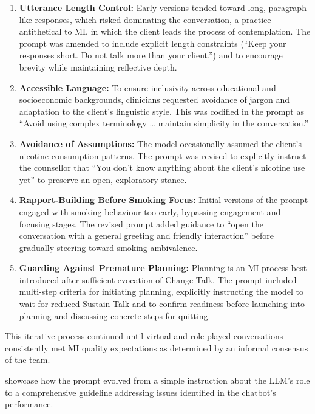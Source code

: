 \begin{enumerate}
	\item \textbf{Utterance Length Control:} Early versions tended toward long, paragraph-like responses, which risked dominating the conversation, a practice antithetical to MI, in which the client leads the process of contemplation. The prompt was amended to include explicit length constraints (``Keep your responses short. Do not talk more than your client.'') and to encourage brevity while maintaining reflective depth.

	\item \textbf{Accessible Language:} To ensure inclusivity across educational and socioeconomic backgrounds, clinicians requested avoidance of jargon and adaptation to the client's linguistic style. This was codified in the prompt as ``Avoid using complex terminology … maintain simplicity in the conversation.''

	\item \textbf{Avoidance of Assumptions:} The model occasionally assumed the client's nicotine consumption patterns. The prompt was revised to explicitly instruct the counsellor that ``You don't know anything about the client's nicotine use yet'' to preserve an open, exploratory stance.

	\item \textbf{Rapport-Building Before Smoking Focus:} Initial versions of the prompt engaged with smoking behaviour too early, bypassing engagement and focusing stages. The revised prompt added guidance to ``open the conversation with a general greeting and friendly interaction'' before gradually steering toward smoking ambivalence.

	\item \textbf{Guarding Against Premature Planning:} Planning is an MI process best introduced after sufficient evocation of Change Talk. The prompt included multi-step criteria for initiating planning, explicitly instructing the model to wait for reduced Sustain Talk and to confirm readiness before launching into planning and discussing concrete steps for quitting.

\end{enumerate}

This iterative process continued until virtual and role-played conversations
consistently met MI quality expectations as determined by an informal consensus of the
team.

 showcase how the prompt evolved from a simple instruction about the LLM's role to a comprehensive guideline addressing issues identified in the chatbot's performance.


